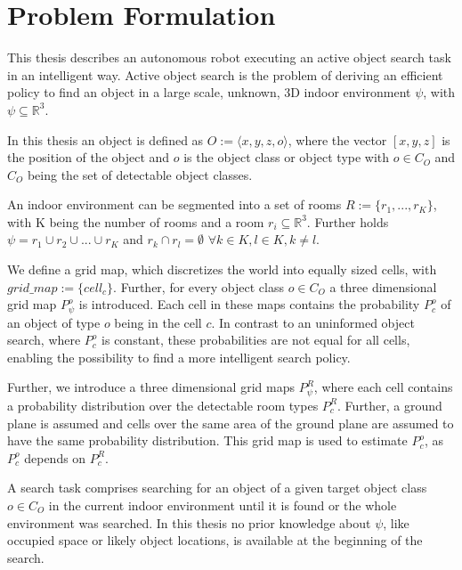 \chapter{Problem Formulation}

This thesis describes an autonomous robot executing an active object search task in an intelligent way. Active object search is the problem of deriving an efficient policy to find an object in a large scale, unknown, $3$D indoor environment $\psi$, with $\psi \subseteq \mathbb{R}^3$. 

In this thesis an object is defined as $O := \langle x,y,z,o\rangle$, where the vector $[x,y,z]$ is the position of the object and $o$ is the object class or object type with $o \in C_{O}$ and $C_{O}$ being the set of detectable object classes. 

An indoor environment can be segmented into a set of rooms $R := \{r_{1}, ..., r_{K}\}$, with K being the number of rooms and a room $r_i \subseteq \mathbb{R}^3$. Further holds $\psi = r_{1} \cup r_{2} \cup ... \cup r_{K}$ and $r_{k} \cap r_{l} = \emptyset$ $\forall k \in K, l \in K, k \neq l$. 

We define a grid map, which discretizes the world into equally sized cells, with $grid\_map := \{cell_c\}$. Further, for every object class $o \in C_O$ a three dimensional grid map $P_{\psi}^o$ is introduced. Each cell in these maps contains the probability $P_{c}^o$ of an object of type $o$ being in the cell $c$. In contrast to an uninformed object search, where $P_{c}^o$ is constant, these probabilities are not equal for all cells, enabling the possibility to find a more intelligent search policy. 

Further, we introduce a three dimensional grid maps $P_{\psi}^R$, where each cell contains a probability distribution over the detectable room types $P_{c}^R$. Further, a ground plane is assumed and cells over the same area of the ground plane are assumed to have the same probability distribution. This grid map is used to estimate $P_{c}^o$, as $P_{c}^o$ depends on $P_{c}^R$.

A search task comprises searching for an object of a given target object class $o \in C_{O}$ in the current indoor environment  until it is found or the whole environment was searched. In this thesis no prior knowledge about $\psi$, like occupied space or likely object locations, is available at the beginning of the search.

